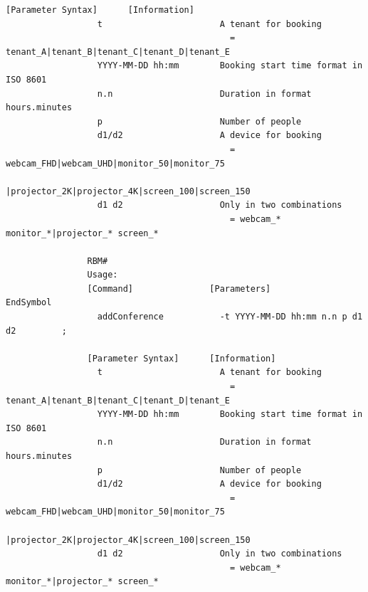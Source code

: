 \documentclass{article}
\begin{document}
\begin{Verbatim}[gobble=8]
                [Parameter Syntax]      [Information]                                         
                  t                       A tenant for booking                                
                                            = tenant_A|tenant_B|tenant_C|tenant_D|tenant_E    
                  YYYY-MM-DD hh:mm        Booking start time format in ISO 8601               
                  n.n                     Duration in format hours.minutes                    
                  p                       Number of people                                    
                  d1/d2                   A device for booking                                
                                            = webcam_FHD|webcam_UHD|monitor_50|monitor_75     
                                              |projector_2K|projector_4K|screen_100|screen_150
                  d1 d2                   Only in two combinations                            
                                            = webcam_* monitor_*|projector_* screen_*         
                
                RBM#
                Usage: 
                [Command]               [Parameters]                            EndSymbol     
                  addConference           -t YYYY-MM-DD hh:mm n.n p d1 d2         ;           
                
                [Parameter Syntax]      [Information]                                         
                  t                       A tenant for booking                                
                                            = tenant_A|tenant_B|tenant_C|tenant_D|tenant_E    
                  YYYY-MM-DD hh:mm        Booking start time format in ISO 8601               
                  n.n                     Duration in format hours.minutes                    
                  p                       Number of people                                    
                  d1/d2                   A device for booking                                
                                            = webcam_FHD|webcam_UHD|monitor_50|monitor_75     
                                              |projector_2K|projector_4K|screen_100|screen_150
                  d1 d2                   Only in two combinations                            
                                            = webcam_* monitor_*|projector_* screen_*         
                

\end{Verbatim}
\end{document}
